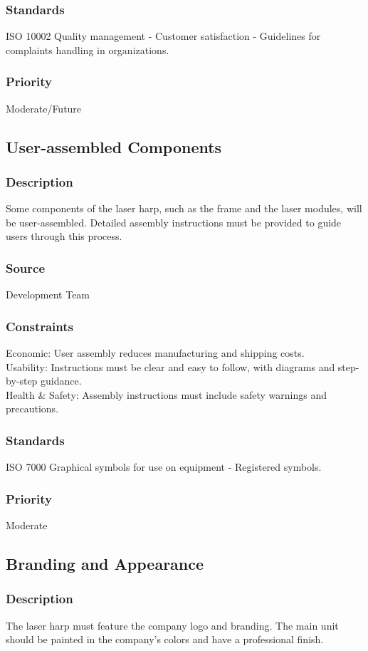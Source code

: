\subsubsection{Standards}
ISO 10002 Quality management - Customer satisfaction - Guidelines for complaints handling in organizations.
\subsubsection{Priority}
Moderate/Future


\subsection{User-assembled Components}
\subsubsection{Description}
Some components of the laser harp, such as the frame and the laser modules, will be user-assembled. Detailed assembly instructions must be provided to guide users through this process.
\subsubsection{Source}
Development Team
\subsubsection{Constraints}
Economic: User assembly reduces manufacturing and shipping costs.\\
Usability: Instructions must be clear and easy to follow, with diagrams and step-by-step guidance.\\
Health & Safety: Assembly instructions must include safety warnings and precautions.
\subsubsection{Standards}
ISO 7000 Graphical symbols for use on equipment - Registered symbols.
\subsubsection{Priority}
Moderate


\subsection{Branding and Appearance}
\subsubsection{Description}
The laser harp must feature the company logo and branding. The main unit should be painted in the company’s colors and have a professional finish.
